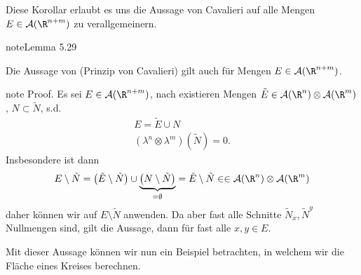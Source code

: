 \documentclass[letterpaper,10pt,german]{jupyterBook}
\begin{document}
\sphinxAtStartPar
Diese Korollar erlaubt es uns die Aussage von Cavalieri auf alle Mengen \(E\in \mathcal{A}(\R^{n+m})\) zu verallgemeinern.
\label{masstheorie/integrationstechnik:lemma-18}
\begin{sphinxadmonition}{note}{Lemma 5.29}



\sphinxAtStartPar
Die Aussage von {\hyperref[\detokenize{masstheorie/integrationstechnik:thm:cavalieri}]{}} (Prinzip von Cavalieri) gilt auch für Mengen \(E\in \mathcal{A}(\R^{n+m})\).
\end{sphinxadmonition}

\begin{sphinxadmonition}{note}
\sphinxAtStartPar
Proof. Es sei \(E\in \mathcal{A}(\R^{n+m})\), nach {\hyperref[\detokenize{masstheorie/integrationstechnik:lem:completelebesgue}]{}} existieren Mengen \(\tilde{E}\in\mathcal{A}(\R^n)\otimes\mathcal{A}(\R^m)\), \(N\subset \tilde{N}\), s.d.
\begin{equation*}
\begin{split}E = \tilde{E}\cup N\\
(\lambda^n\otimes\lambda^m)(\tilde{N}) = 0.\end{split}
\end{equation*}
\sphinxAtStartPar
Insbesondere ist dann
\begin{equation*}
\begin{split}E\setminus \tilde{N} = \left(\tilde{E}\setminus \tilde{N} \right)\cup \underbrace{\left(N\setminus \tilde{N}\right)}_{=\emptyset} = 
\tilde{E}\setminus \tilde{N}\in \in\mathcal{A}(\R^n)\otimes\mathcal{A}(\R^m)\end{split}
\end{equation*}
\sphinxAtStartPar
daher können wir {\hyperref[\detokenize{masstheorie/integrationstechnik:thm:cavalieri}]{}} auf \(E\setminus \tilde{N}\) anwenden. Da aber fast alle Schnitte \(\tilde{N}_x,\tilde{N}^y\) Nullmengen sind, gilt die Aussage, dann für fast alle \(x,y\in E\).
\end{sphinxadmonition}

\sphinxAtStartPar
Mit dieser Aussage können wir nun ein Beispiel betrachten, in welchem wir die Fläche eines Kreises berechnen.
\end{document}
